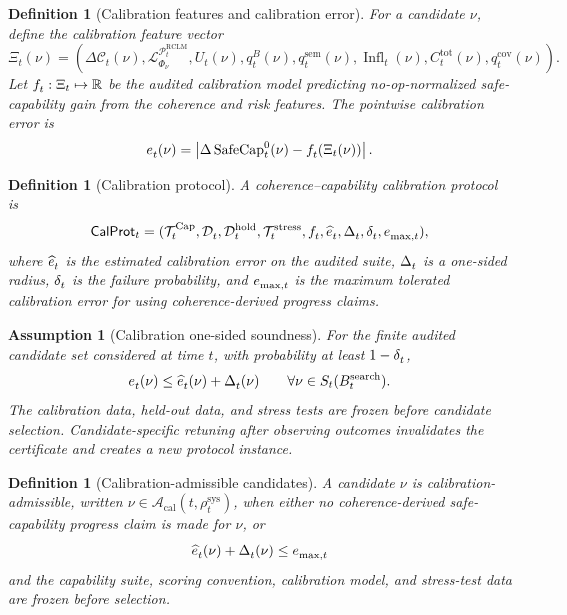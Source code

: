 \documentclass[11pt,a4paper]{article}
\newtheorem{definition}[theorem]{Definition}
\newtheorem{assumption}[theorem]{Assumption}
\newcommand{\Ccal}{\mathcal C}
\newcommand{\Lcal}{\mathcal L}
\newcommand{\Pcal}{\mathcal P}
\newcommand{\Acal}{\mathcal A}
\newcommand{\Tcal}{\mathcal T}
\newcommand{\calib}{\mathrm{cal}}
\newcommand{\hold}{\mathrm{hold}}
\newcommand{\stress}{\mathrm{stress}}
\newcommand{\RCLM}{\mathrm{RCLM}}
\newcommand{\sem}{\mathrm{sem}}
\newcommand{\sys}{\mathrm{sys}}
\providecommand{\Cap}{\operatorname{Cap}}
\newcommand{\SafeCap}{\operatorname{SafeCap}}
\newcommand{\search}{\mathrm{search}}
\newcommand{\tot}{\mathrm{tot}}
\newcommand{\cov}{\mathrm{cov}}
\begin{document}
\begin{definition}[Calibration features and calibration error]
\label{def:calibration-error}
For a candidate \(\nu\), define the calibration feature vector
\[
\Xi_t(\nu)=
(\Delta\Ccal_t(\nu),\Lcal^{\Pcal_t^{\RCLM}}_{\Phi_\nu},U_t(\nu),q_t^B(\nu),q_t^{\sem}(\nu),
\operatorname{Infl}_t(\nu),C_t^{\tot}(\nu),q_t^{\cov}(\nu)).
\]
Let \(f_t^{\cal}:\Xi_t\mapsto\mathbb R\) be the audited calibration model predicting no-op-normalized safe-capability gain from the coherence and risk features. The pointwise calibration error is
\[
e_t^{\cal}(\nu)=
\left|
\Delta\SafeCap_t^0(\nu)-f_t^{\cal}(\Xi_t(\nu))
\right|.
\]
\end{definition}

\begin{definition}[Calibration protocol]
\label{def:calibration-protocol}
A coherence--capability calibration protocol is
\[
\mathsf{CalProt}_t=
(\Tcal_t^{\Cap},\mathcal D_t^{\cal},\mathcal D_t^{\hold},\mathcal T_t^{\stress},
 f_t^{\cal},\widehat e_t^{\cal},\Delta_t^{\cal},\delta_t^{\cal},e_{\max,t}^{\cal}),
\]
where \(\widehat e_t^{\cal}\) is the estimated calibration error on the audited suite, \(\Delta_t^{\cal}\) is a one-sided radius, \(\delta_t^{\cal}\) is the failure probability, and \(e_{\max,t}^{\cal}\) is the maximum tolerated calibration error for using coherence-derived progress claims.
\end{definition}

\begin{assumption}[Calibration one-sided soundness]
\label{ass:calibration-one-sided-soundness}
For the finite audited candidate set considered at time \(t\), with probability at least \(1-\delta_t^{\cal}\),
\[
e_t^{\cal}(\nu)
\le
\widehat e_t^{\cal}(\nu)+\Delta_t^{\cal}(\nu)
\qquad
\forall \nu\in S_t(B_t^{\search}).
\]
The calibration data, held-out data, and stress tests are frozen before candidate selection. Candidate-specific retuning after observing outcomes invalidates the certificate and creates a new protocol instance.
\end{assumption}

\begin{definition}[Calibration-admissible candidates]
\label{def:calibration-admissible}
A candidate \(\nu\) is calibration-admissible, written \(\nu\in\Acal_{\calib}(t,\rho_t^{\sys})\), when either no coherence-derived safe-capability progress claim is made for \(\nu\), or
\[
\widehat e_t^{\cal}(\nu)+\Delta_t^{\cal}(\nu)
\le e_{\max,t}^{\cal}
\]
and the capability suite, scoring convention, calibration model, and stress-test data are frozen before selection.
\end{definition}
\end{document}
